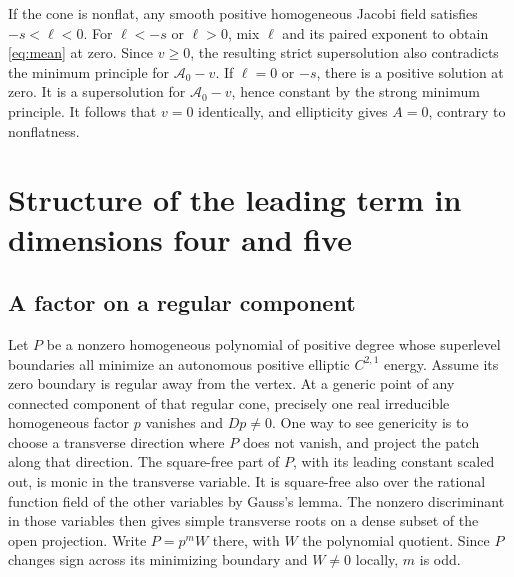 \documentclass[11pt]{amsart}
\begin{document}
If the cone is nonflat, any smooth positive homogeneous Jacobi
field satisfies \(-s<\ell<0\). For \(\ell<-s\) or \(\ell>0\), mix
\(\ell\) and its paired exponent to obtain \eqref{eq:mean} at zero. Since
\(v\ge0\), the resulting strict supersolution also contradicts the
minimum principle for \(\mathcal A_0-v\). If \(\ell=0\) or \(-s\),
there is a positive solution at zero. It is a supersolution for
\(\mathcal A_0-v\), hence constant by the strong minimum principle.
It follows that \(v=0\) identically, and ellipticity gives \(A=0\),
contrary to nonflatness.

\section{Structure of the leading term in dimensions four and five}\label{sec:leading}

\subsection{A factor on a regular component}

Let \(P\) be a nonzero homogeneous polynomial of positive degree
whose superlevel boundaries all minimize an autonomous positive
elliptic \(C^{2,1}\) energy. Assume its zero boundary is regular away from
the vertex. At a generic point of any connected component of that
regular cone, precisely one real irreducible homogeneous factor \(p\)
vanishes and \(Dp\ne0\). One way to see genericity is to choose a
transverse direction where \(P\) does not vanish, and project the patch
along that direction. The square-free part of \(P\), with its leading
constant scaled out, is monic in the transverse variable. It is
square-free also over the rational function field of the other
variables by Gauss's lemma. The nonzero discriminant in those variables
then gives simple transverse roots on a dense subset of the open
projection. Write \(P=p^m W\) there, with \(W\) the polynomial
quotient. Since \(P\) changes sign across its minimizing boundary
and \(W\ne0\) locally, \(m\) is odd.
\end{document}
